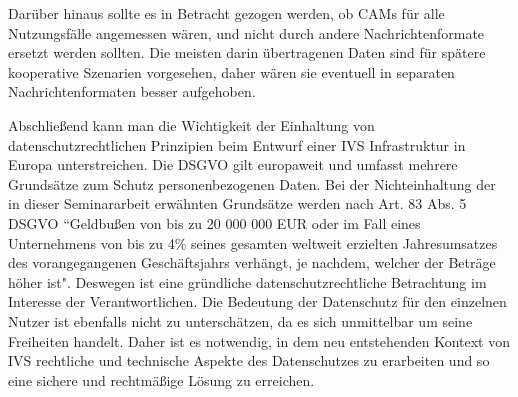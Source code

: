 Darüber hinaus sollte es in Betracht gezogen werden, ob CAMs für alle Nutzungsfälle angemessen wären, und nicht durch andere Nachrichtenformate ersetzt werden sollten. Die meisten darin übertragenen Daten sind für spätere kooperative Szenarien vorgesehen, daher wären sie eventuell in separaten Nachrichtenformaten besser aufgehoben. 

Abschließend kann man die Wichtigkeit der Einhaltung von datenschutzrechtlichen Prinzipien beim Entwurf einer IVS Infrastruktur in Europa unterstreichen. Die DSGVO gilt europaweit und umfasst mehrere Grundsätze zum Schutz personenbezogenen Daten. Bei der Nichteinhaltung der in dieser Seminararbeit erwähnten Grundsätze werden nach Art. 83 Abs. 5 DSGVO ``Geldbußen von bis zu 20 000 000 EUR oder im Fall eines Unternehmens von bis zu 4\% seines gesamten weltweit erzielten Jahresumsatzes des vorangegangenen Geschäftsjahrs verhängt, je nachdem, welcher der Beträge höher ist". Deswegen ist eine gründliche datenschutzrechtliche Betrachtung im Interesse der Verantwortlichen. Die Bedeutung der Datenschutz für den einzelnen Nutzer ist ebenfalls nicht zu unterschätzen, da es sich unmittelbar um seine Freiheiten handelt. Daher ist es notwendig, in dem neu entstehenden Kontext von IVS rechtliche und technische Aspekte des Datenschutzes zu erarbeiten und so eine sichere und rechtmäßige Lösung zu erreichen.






